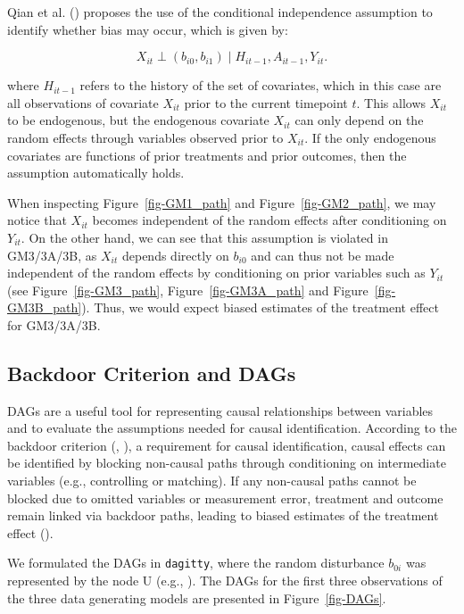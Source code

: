 \documentclass[
  12pt,
  a4paper,
]{article}
\begin{document}
Qian et al. () proposes the use of the
conditional independence assumption to identify whether bias may occur,
which is given by:

\[ X_{it} \perp (b_{i0}, b_{i1}) \mid H_{it-1}, A_{it-1}, Y_{it}. \]

where \(H_{it-1}\) refers to the history of the set of covariates, which
in this case are all observations of covariate \(X_{it}\) prior to the
current timepoint \(t\). This allows \(X_{it}\) to be endogenous, but
the endogenous covariate \(X_{it}\) can only depend on the random
effects through variables observed prior to \(X_{it}\). If the only
endogenous covariates are functions of prior treatments and prior
outcomes, then the assumption automatically holds.

When inspecting Figure~\ref{fig-GM1_path} and Figure~\ref{fig-GM2_path},
we may notice that \(X_{it}\) becomes independent of the random effects
after conditioning on \(Y_{it}\). On the other hand, we can see that
this assumption is violated in GM3/3A/3B, as \(X_{it}\) depends directly
on \(b_{i0}\) and can thus not be made independent of the random effects
by conditioning on prior variables such as \(Y_{it}\) (see
Figure~\ref{fig-GM3_path}, Figure~\ref{fig-GM3A_path} and
Figure~\ref{fig-GM3B_path}). Thus, we would expect biased estimates of
the treatment effect for GM3/3A/3B.

\subsection{Backdoor Criterion and
DAGs}\label{backdoor-criterion-and-dags}

DAGs are a useful tool for representing causal relationships between
variables and to evaluate the assumptions needed for causal
identification. According to the backdoor criterion
(, ),
a requirement for causal identification, causal effects can be
identified by blocking non-causal paths through conditioning on
intermediate variables (e.g., controlling or matching). If any
non-causal paths cannot be blocked due to omitted variables or
measurement error, treatment and outcome remain linked via backdoor
paths, leading to biased estimates of the treatment effect
().

We formulated the DAGs in \texttt{dagitty}, where the random disturbance
\(b_{0i}\) was represented by the node U (e.g.,
). The DAGs for the first
three observations of the three data generating models are presented in
Figure~\ref{fig-DAGs}.
\end{document}
